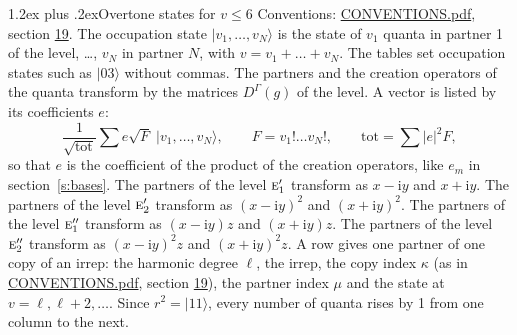 \documentclass[10pt,a4paper]{article}
\makeatletter
\renewcommand\section{\@startsection{section}{1}{\z@}{-3ex plus -1ex minus -.2ex}%
  {1.2ex plus .2ex}{\normalfont\large\sffamily\bfseries\color{parttitle}}}
\numberwithin{equation}{section}
\newcommand{\irr}[1]{\text{\normalfont\scshape #1}}
\newcommand{\iunit}{\mathrm{i}}
\newcommand{\repD}[1]{D^{#1}}
\newcommand{\mult}{\kappa}
\newcommand{\intx}{\mu}
\newcommand{\occ}[1]{\lvert #1\rangle}
\makeatother
\begin{document}
\section{Overtone states for \texorpdfstring{$v \le 6$}{v \textleq\ 6}}\label{s:overtone_states}
Conventions: \href{../../CONVENTIONS.pdf}{CONVENTIONS.pdf}, section \href{../../CONVENTIONS.pdf\#conv.19}{19}.
\leavevmode\label{n:vector.occupation}\label{n:local.quanta.partner}\label{n:local.weight.occupation}The occupation state $\occ{v_1, \dots, v_N}$ is the state of $v_1$ quanta in partner 1 of the level, \dots, $v_N$ in partner $N$, with $v = v_1 + \dots + v_N$. The tables set occupation states such as $\occ{03}$ without commas. The partners and the creation operators of the quanta transform by the matrices $\repD{\Gamma}(g)$ of the level. A vector is listed by its coefficients $e$:
\begin{equation}\label{e:occupation}\frac{1}{\sqrt{\mathrm{tot}}}\sum e\sqrt{F}\;\occ{v_1, \dots, v_N},\qquad F = v_1!\dots v_N!,\qquad \mathrm{tot} = \sum |e|^2F,\end{equation}
so that $e$ is the coefficient of the product of the creation operators, like $e_m$ in section~\ref{s:bases}. The partners of the level $\irr{e}_{1}'$ transform as $x - \iunit y$ and $x + \iunit y$. The partners of the level $\irr{e}_{2}'$ transform as $(x - \iunit y)^{2}$ and $(x + \iunit y)^{2}$. The partners of the level $\irr{e}_{1}''$ transform as $(x - \iunit y) z$ and $(x + \iunit y) z$. The partners of the level $\irr{e}_{2}''$ transform as $(x - \iunit y)^{2} z$ and $(x + \iunit y)^{2} z$. A row gives one partner of one copy of an irrep: the harmonic degree $\ell$, the irrep, the copy index $\mult$ (as in \href{../../CONVENTIONS.pdf}{CONVENTIONS.pdf}, section \href{../../CONVENTIONS.pdf\#conv.19}{19}), the partner index $\intx$ and the state at $v = \ell, \ell + 2, \dots$. Since $r^2 = \occ{11}$, every number of quanta rises by 1 from one column to the next.
\end{document}
